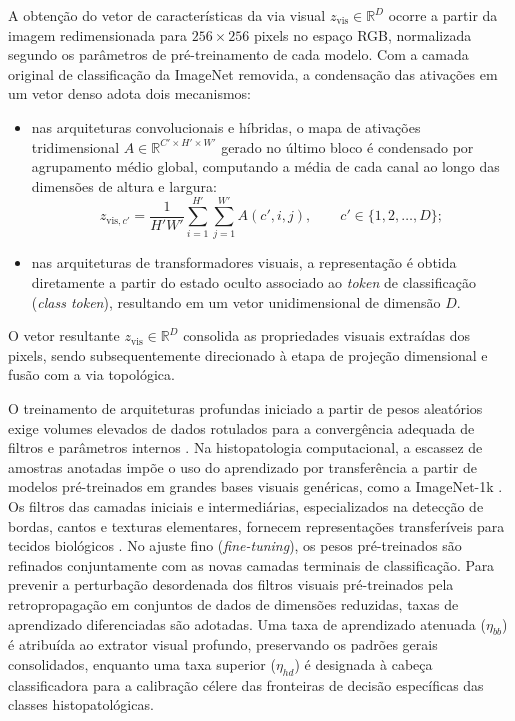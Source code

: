 A obtenção do vetor de características da via visual $z_{\mathrm{vis}} \in \mathbb{R}^D$ ocorre a partir da imagem redimensionada para $256 \times 256$ pixels no espaço RGB, normalizada segundo os parâmetros de pré-treinamento de cada modelo. Com a camada original de classificação da ImageNet removida, a condensação das ativações em um vetor denso adota dois mecanismos:
\begin{itemize}
    \item nas arquiteturas convolucionais e híbridas, o mapa de ativações tridimensional $A \in \mathbb{R}^{C' \times H' \times W'}$ gerado no último bloco é condensado por agrupamento médio global, computando a média de cada canal ao longo das dimensões de altura e largura:
    \begin{equation}
    z_{\mathrm{vis}, c'} = \frac{1}{H' W'} \sum_{i=1}^{H'} \sum_{j=1}^{W'} A(c', i, j), \qquad c' \in \{1, 2, \ldots, D\};
    \label{eq:gap}
    \end{equation}
    \item nas arquiteturas de transformadores visuais, a representação é obtida diretamente a partir do estado oculto associado ao \textit{token} de classificação (\textit{class token}), resultando em um vetor unidimensional de dimensão $D$.
\end{itemize}
O vetor resultante $z_{\mathrm{vis}} \in \mathbb{R}^D$ consolida as propriedades visuais extraídas dos pixels, sendo subsequentemente direcionado à etapa de projeção dimensional e fusão com a via topológica.

O treinamento de arquiteturas profundas iniciado a partir de pesos aleatórios exige volumes elevados de dados rotulados para a convergência adequada de filtros e parâmetros internos \cite{srinidhi2021deep}. Na histopatologia computacional, a escassez de amostras anotadas impõe o uso do aprendizado por transferência a partir de modelos pré-treinados em grandes bases visuais genéricas, como a ImageNet-1k \cite{imagenet,autoHistImg}. Os filtros das camadas iniciais e intermediárias, especializados na detecção de bordas, cantos e texturas elementares, fornecem representações transferíveis para tecidos biológicos \cite{litjens2017survey}. No ajuste fino (\textit{fine-tuning}), os pesos pré-treinados são refinados conjuntamente com as novas camadas terminais de classificação. Para prevenir a perturbação desordenada dos filtros visuais pré-treinados pela retropropagação em conjuntos de dados de dimensões reduzidas, taxas de aprendizado diferenciadas são adotadas. Uma taxa de aprendizado atenuada ($\eta_{bb}$) é atribuída ao extrator visual profundo, preservando os padrões gerais consolidados, enquanto uma taxa superior ($\eta_{hd}$) é designada à cabeça classificadora para a calibração célere das fronteiras de decisão específicas das classes histopatológicas.

